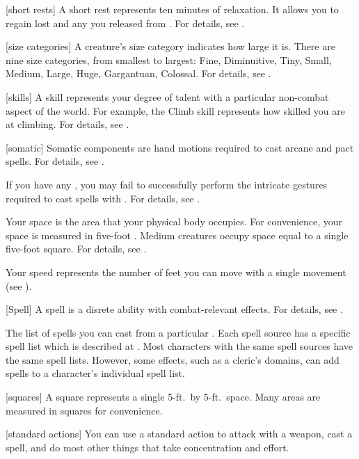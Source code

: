 [short rests] A short rest represents ten minutes of relaxation.
It allows you to regain lost  and any  you released from .
For details, see .

[size categories] A creature's size category indicates how large it is.
There are nine size categories, from smallest to largest: Fine, Diminuitive, Tiny, Small, Medium, Large, Huge, Gargantuan, Colossal.
For details, see .

[skills] A skill represents your degree of talent with a particular non-combat aspect of the world.
For example, the Climb skill represents how skilled you are at climbing.
For details, see .

[somatic] Somatic components are hand motions required to cast arcane and pact spells.
For details, see .

 If you have any , you may fail to successfully perform the intricate gestures required to cast spells with .
For details, see .

 Your space is the area that your physical body occupies.
For convenience, your space is measured in five-foot .
Medium creatures occupy space equal to a single five-foot square.
For details, see .

 Your speed represents the number of feet you can move with a single movement (see ).

[Spell] A spell is a disrete \magical ability with combat-relevant effects.
For details, see .

 The list of spells you can cast from a particular .
Each spell source has a specific spell list which is described at .
Most characters with the same spell sources have the same spell lists.
However, some effects, such as a cleric's domains, can add spells to a character's individual spell list.

[squares] A square represents a single 5-ft.\ by 5-ft.\ space.
Many areas are measured in squares for convenience.

[standard actions] You can use a standard action to attack with a weapon, cast a spell, and do most other things that take concentration and effort.

